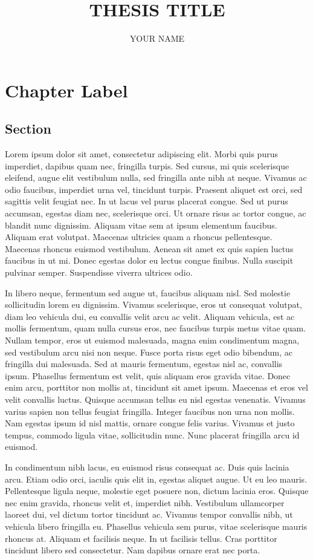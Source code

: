 \documentclass[draft]{yorkUThesisTemplate}
\title{THESIS TITLE}
\author{YOUR NAME}
\begin{document}
\makefrontmatter
\formatmainmatter

\chapter{Chapter Label}
\section{Section}
Lorem ipsum dolor sit amet, consectetur adipiscing elit. Morbi quis purus imperdiet, dapibus quam nec, fringilla turpis. Sed cursus, mi quis scelerisque eleifend, augue elit vestibulum nulla, sed fringilla ante nibh at neque. Vivamus ac odio faucibus, imperdiet urna vel, tincidunt turpis. Praesent aliquet est orci, sed sagittis velit feugiat nec. In ut lacus vel purus placerat congue. Sed ut purus accumsan, egestas diam nec, scelerisque orci. Ut ornare risus ac tortor congue, ac blandit nunc dignissim. Aliquam vitae sem at ipsum elementum faucibus. Aliquam erat volutpat. Maecenas ultricies quam a rhoncus pellentesque. Maecenas rhoncus euismod vestibulum. Aenean sit amet ex quis sapien luctus faucibus in ut mi. Donec egestas dolor eu lectus congue finibus. Nulla suscipit pulvinar semper. Suspendisse viverra ultrices odio.

In libero neque, fermentum sed augue ut, faucibus aliquam nisl. Sed molestie sollicitudin lorem eu dignissim. Vivamus scelerisque, eros ut consequat volutpat, diam leo vehicula dui, eu convallis velit arcu ac velit. Aliquam vehicula, est ac mollis fermentum, quam nulla cursus eros, nec faucibus turpis metus vitae quam. Nullam tempor, eros ut euismod malesuada, magna enim condimentum magna, sed vestibulum arcu nisi non neque. Fusce porta risus eget odio bibendum, ac fringilla dui malesuada. Sed at mauris fermentum, egestas nisl ac, convallis ipsum. Phasellus fermentum est velit, quis aliquam eros gravida vitae. Donec enim arcu, porttitor non mollis at, tincidunt sit amet ipsum. Maecenas et eros vel velit convallis luctus. Quisque accumsan tellus eu nisl egestas venenatis. Vivamus varius sapien non tellus feugiat fringilla. Integer faucibus non urna non mollis. Nam egestas ipsum id nisl mattis, ornare congue felis varius. Vivamus et justo tempus, commodo ligula vitae, sollicitudin nunc. Nunc placerat fringilla arcu id euismod.

In condimentum nibh lacus, eu euismod risus consequat ac. Duis quis lacinia arcu. Etiam odio orci, iaculis quis elit in, egestas aliquet augue. Ut eu leo mauris. Pellentesque ligula neque, molestie eget posuere non, dictum lacinia eros. Quisque nec enim gravida, rhoncus velit et, imperdiet nibh. Vestibulum ullamcorper laoreet dui, vel dictum tortor tincidunt ac. Vivamus tempor convallis nibh, ut vehicula libero fringilla eu. Phasellus vehicula sem purus, vitae scelerisque mauris rhoncus at. Aliquam et facilisis neque. In ut facilisis tellus. Cras porttitor tincidunt libero sed consectetur. Nam dapibus ornare erat nec porta.
\end{document}
